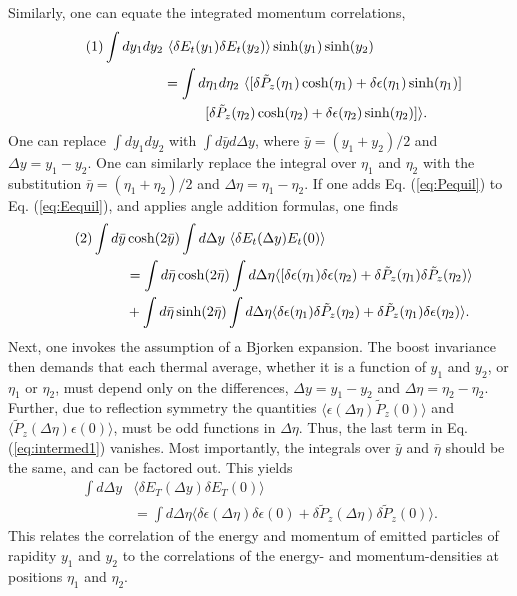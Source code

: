\documentclass[12pt]{article}
\numberwithin{equation}{section}
\numberwithin{figure}{section}
\newcommand\eqnumber{\addtocounter{equation}{1}\tag{\theequation}}
\begin{document}
Similarly, one can equate the integrated momentum correlations,
\begin{align*}\eqnumber\label{eq:Pequil}
\int dy_1dy_2&~\langle\delta E_t(y_1)\delta E_t(y_2)\rangle\sinh(y_1)\sinh(y_2)\\
&=\int d\eta_1d\eta_2~\langle[\delta \tilde{P}_z(\eta_1)\cosh(\eta_1)+\delta\epsilon(\eta_1)\sinh(\eta_1)]\\\
&\hspace*{30pt}[\delta\tilde{P}_z(\eta_2)\cosh(\eta_2)+\delta\epsilon(\eta_2)\sinh(\eta_2)]\rangle.
\end{align*}
One can replace $\int dy_1dy_2$ with $\int d\bar{y}d\Delta y$, where $\bar{y}=(y_1+y_2)/2$ and $\Delta y=y_1-y_2$. One can similarly replace the integral over $\eta_1$ and $\eta_2$ with the substitution $\bar{\eta}=(\eta_1+\eta_2)/2$ and $\Delta\eta=\eta_1-\eta_2$. If one adds Eq. (\ref{eq:Pequil}) to Eq. (\ref{eq:Eequil}), and applies angle addition formulas, one finds
\begin{align*}\eqnumber\label{eq:intermed1}
\int d\bar{y} &\cosh(2\bar{y})\int d\Delta y~\langle\delta E_t(\Delta y)E_t(0)\rangle\\
&=\int d\bar{\eta}\cosh(2\bar{\eta})\int d\Delta\eta\langle
[\delta\epsilon(\eta_1)\delta\epsilon(\eta_2)+\delta\tilde{P}_z(\eta_1)\delta\tilde{P}_z(\eta_2)\rangle\\
&+\int d\bar{\eta} \sinh(2\bar{\eta})\int d\Delta\eta
\langle\delta\epsilon(\eta_1)\delta\tilde{P}_z(\eta_2)+\delta\tilde{P}_z(\eta_1)\delta\epsilon(\eta_2)\rangle.
\end{align*}
Next, one invokes the assumption of a Bjorken expansion. The boost invariance then demands that each thermal average, whether it is a function of $y_1$ and $y_2$, or $\eta_1$ or $\eta_2$, must depend only on the differences, $\Delta y=y_1-y_2$ and $\Delta\eta=\eta_2-\eta_2$. Further, due to reflection symmetry the quantities $\langle \epsilon(\Delta\eta)\tilde{P}_z(0)\rangle$ and $\langle \tilde{P}_z(\Delta\eta)\epsilon(0)\rangle$, must be odd functions in $\Delta\eta$. Thus, the last term in Eq. (\ref{eq:intermed1}) vanishes. Most importantly, the integrals over $\bar{y}$ and $\bar{\eta}$ should be the same, and can be factored out. This yields
\begin{align*}
\int d\Delta y&\langle \delta E_T(\Delta y)\delta E_T(0)\rangle\\
&=\int d\Delta\eta\langle \delta\epsilon(\Delta\eta)\delta\epsilon(0)+\delta\tilde{P}_z(\Delta\eta)\delta\tilde{P}_z(0)\rangle.
\end{align*}
This relates the correlation of the energy and momentum of emitted particles of rapidity $y_1$ and $y_2$ to the correlations of the energy- and momentum-densities at positions $\eta_1$ and $\eta_2$. 
\end{document}
